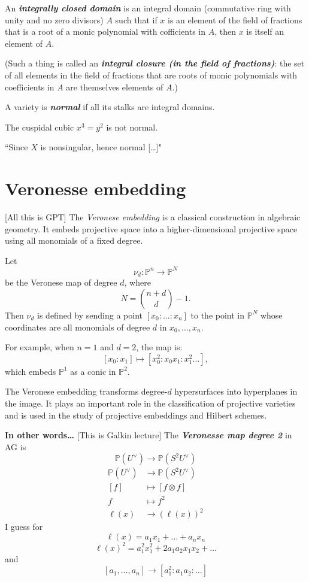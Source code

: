 An \textit{\textbf{integrally closed domain}} is an integral domain (commutative ring with unity and no zero divisors) \(A\) such that if \(x\) is an element of the field of fractions that is a root of a monic polynomial with cofficients in \(A\), then \(x\) is itself an element of \(A\).

(Such a thing is called an \textit{\textbf{integral closure (in the field of fractions)}}: the set of all elements in the field of fractions that are roots of monic polynomials with coefficients in \(A\) are themselves elements of \(A\).)

A variety is \textit{\textbf{normal}} if all its stalks are integral domains.

The cuspidal cubic \(x^3=y^2\) is not normal.

``Since \(X\) is nonsingular, hence normal […]"




\section{Veronesse embedding}
[All this is GPT] The \emph{Veronese embedding} is a classical construction in algebraic geometry. It embeds projective space into a higher-dimensional projective space using all monomials of a fixed degree.

Let
\[
\nu_d : \mathbb{P}^n \to \mathbb{P}^N
\]
be the Veronese map of degree \( d \), where
\[
N = \binom{n + d}{d} - 1.
\]
Then \( \nu_d \) is defined by sending a point \( [x_0 : \dots : x_n] \) to the point in \( \mathbb{P}^N \) whose coordinates are all monomials of degree \( d \) in \( x_0, \dots, x_n \).

For example, when \( n = 1 \) and \( d = 2 \), the map is:
\[
[x_0 : x_1] \mapsto [x_0^2 : x_0x_1 : x_1^2\ldots],
\]
which embeds \( \mathbb{P}^1 \) as a conic in \( \mathbb{P}^2 \).

The Veronese embedding transforms degree-\( d \) hypersurfaces into hyperplanes in the image. It plays an important role in the classification of projective varieties and is used in the study of projective embeddings and Hilbert schemes.

\textbf{In other words…} [This is Galkin lecture] The \textit{\textbf{Veronesse map degree 2}} in AG is 
\[\mathbb{P}(U^\vee) \to \mathbb{P}(S^2 U^\vee)\]
\begin{align*}
	\mathbb{P}(U^\vee ) &\longrightarrow \mathbb{P}(S^2U^\vee) \\
	[f] &\longmapsto [f \otimes f]\\
	f & \longmapsto f^2\\
	\ell(x) & \longrightarrow (\ell(x))^2
\end{align*}
I guess for
\[\ell(x)=a_1x_1+\ldots+a_nx_n\]
\[\ell(x)^2=a_1^2x_1^2+2a_1a_2x_1x_2+\ldots\]
and
\[[a_1,\ldots,a_n]\to [a_1^2:a_1a_2:\ldots]\]

